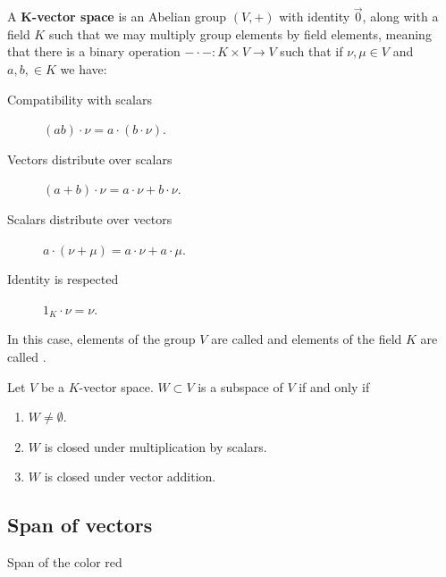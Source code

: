 \documentclass{ximera}
\begin{document}
\begin{definition}
  A \textbf{$\boldsymbol{K}$-vector space} is an Abelian group $(V,+)$
  with identity $\vec{0}$, along with a field $K$ such that we may
  multiply group elements by field elements, meaning that there is a
  binary operation $-\cdot-: K\times V \to V$ such that if $\nu,\mu\in
  V$ and $a,b,\in K$ we have:
\begin{description}
\item[Compatibility with scalars] $(ab)\cdot \nu = a\cdot (b\cdot \nu)$.
\item[Vectors distribute over scalars] $(a+b)\cdot \nu =
  a\cdot\nu + b\cdot \nu$.
\item[Scalars distribute over vectors] $a\cdot (\nu+\mu) =
  a\cdot \nu + a\cdot \mu$.
\item[Identity is respected] $1_K\cdot \nu = \nu$.
\end{description}
In this case, elements of the group $V$ are called  and
elements of the field $K$ are called .
\end{definition}

\begin{lemma}
  Let $V$ be a $K$-vector space. $W\subset V$ is a subspace of $V$ if
  and only if
  \begin{enumerate}
  \item $W\ne \emptyset$.
  \item $W$ is closed under multiplication by scalars.
  \item $W$ is closed under vector addition.
  \end{enumerate}
\end{lemma}

\subsection{Span of vectors}

Span of the color red

\begin{center}
\end{center}
\end{document}
